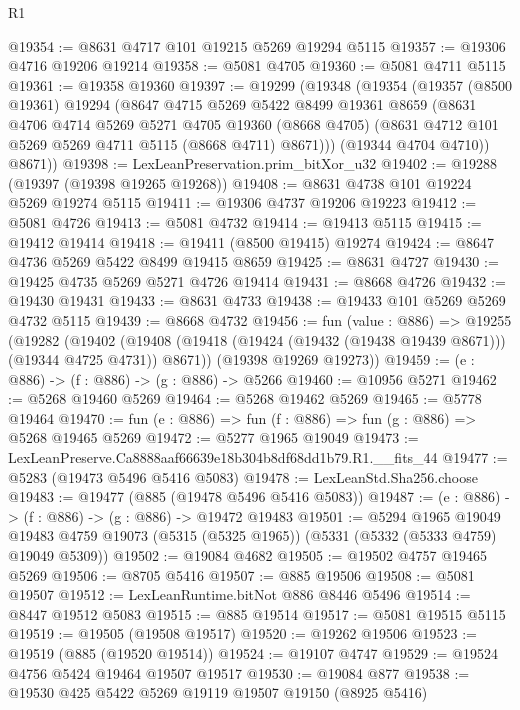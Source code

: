 \begin{lexlean}{R1}
\begin{coremodule}
@19354 := @8631 @4717 @101 @19215 @5269 @19294 @5115
@19357 := @19306 @4716 @19206 @19214
@19358 := @5081 @4705
@19360 := @5081 @4711 @5115
@19361 := @19358 @19360
@19397 := @19299
    (@19348
      (@19354
        (@19357
          (@8500 @19361)
          @19294
          (@8647
            @4715
            @5269
            @5422
            @8499
            @19361
            @8659
            (@8631
              @4706
              @4714
              @5269
              @5271
              @4705
              @19360
              (@8668 @4705)
              (@8631 @4712 @101 @5269 @5269 @4711 @5115 (@8668 @4711) @8671)))
          (@19344 @4704 @4710))
        @8671))
@19398 := LexLeanPreservation.prim_bitXor_u32
@19402 := @19288 (@19397 (@19398 @19265 @19268))
@19408 := @8631 @4738 @101 @19224 @5269 @19274 @5115
@19411 := @19306 @4737 @19206 @19223
@19412 := @5081 @4726
@19413 := @5081 @4732
@19414 := @19413 @5115
@19415 := @19412 @19414
@19418 := @19411 (@8500 @19415) @19274
@19424 := @8647 @4736 @5269 @5422 @8499 @19415 @8659
@19425 := @8631 @4727
@19430 := @19425 @4735 @5269 @5271 @4726 @19414
@19431 := @8668 @4726
@19432 := @19430 @19431
@19433 := @8631 @4733
@19438 := @19433 @101 @5269 @5269 @4732 @5115
@19439 := @8668 @4732
@19456 := fun (value : @886) =>
  @19255
    (@19282
      (@19402 (@19408 (@19418 (@19424 (@19432 (@19438 @19439 @8671))) (@19344 @4725 @4731)) @8671))
      (@19398 @19269 @19273))
@19459 := (e : @886) -> (f : @886) -> (g : @886) -> @5266
@19460 := @10956 @5271
@19462 := @5268 @19460 @5269
@19464 := @5268 @19462 @5269
@19465 := @5778 @19464
@19470 := fun (e : @886) => fun (f : @886) => fun (g : @886) => @5268 @19465 @5269
@19472 := @5277 @1965 @19049
@19473 := LexLeanPreserve.Ca8888aaf66639e18b304b8df68dd1b79.R1.__fits_44
@19477 := @5283 (@19473 @5496 @5416 @5083)
@19478 := LexLeanStd.Sha256.choose
@19483 := @19477 (@885 (@19478 @5496 @5416 @5083))
@19487 := (e : @886) -> (f : @886) -> (g : @886) -> @19472 @19483
@19501 := @5294
    @1965
    @19049
    @19483
    @4759
    @19073
    (@5315 (@5325 @1965))
    (@5331 (@5332 (@5333 @4759) @19049 @5309))
@19502 := @19084 @4682
@19505 := @19502 @4757 @19465 @5269
@19506 := @8705 @5416
@19507 := @885 @19506
@19508 := @5081 @19507
@19512 := LexLeanRuntime.bitNot @886 @8446 @5496
@19514 := @8447 @19512 @5083
@19515 := @885 @19514
@19517 := @5081 @19515 @5115
@19519 := @19505 (@19508 @19517)
@19520 := @19262 @19506
@19523 := @19519 (@885 (@19520 @19514))
@19524 := @19107 @4747
@19529 := @19524 @4756 @5424 @19464 @19507 @19517
@19530 := @19084 @877
@19538 := @19530 @425 @5422 @5269 @19119 @19507 @19150 (@8925 @5416)

\end{coremodule}
\end{lexlean}
